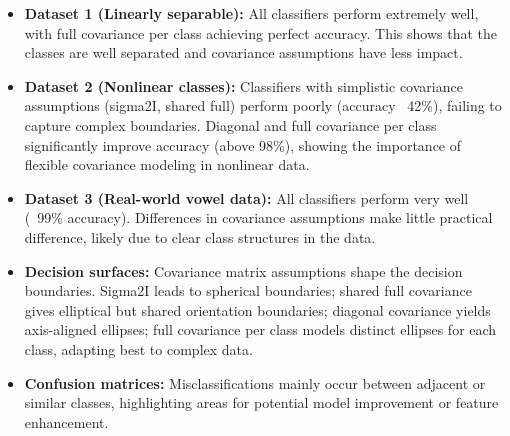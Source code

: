 \begin{itemize}
    \item \textbf{Dataset 1 (Linearly separable):} All classifiers perform extremely well, with full covariance per class achieving perfect accuracy. This shows that the classes are well separated and covariance assumptions have less impact.
    \item \textbf{Dataset 2 (Nonlinear classes):} Classifiers with simplistic covariance assumptions (sigma2I, shared full) perform poorly (accuracy ~42\%), failing to capture complex boundaries. Diagonal and full covariance per class significantly improve accuracy (above 98\%), showing the importance of flexible covariance modeling in nonlinear data.
    \item \textbf{Dataset 3 (Real-world vowel data):} All classifiers perform very well (~99\% accuracy). Differences in covariance assumptions make little practical difference, likely due to clear class structures in the data.
    \item \textbf{Decision surfaces:} Covariance matrix assumptions shape the decision boundaries. Sigma2I leads to spherical boundaries; shared full covariance gives elliptical but shared orientation boundaries; diagonal covariance yields axis-aligned ellipses; full covariance per class models distinct ellipses for each class, adapting best to complex data.
    \item \textbf{Confusion matrices:} Misclassifications mainly occur between adjacent or similar classes, highlighting areas for potential model improvement or feature enhancement.
\end{itemize}
